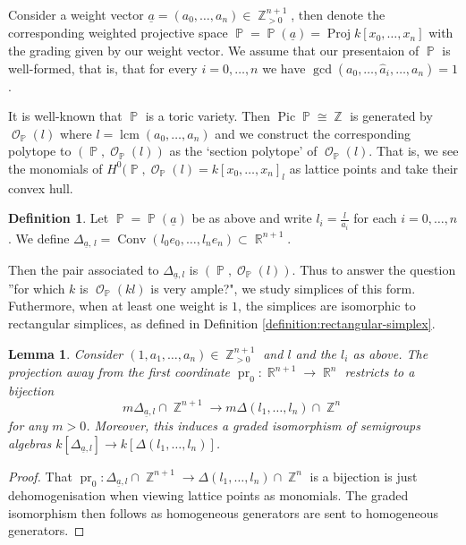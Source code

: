 \documentclass[a4paper,11pt]{amsart}
\theoremstyle{plain}
\newtheorem{lemma}[theorem]{Lemma}
\theoremstyle{definition}
\newtheorem{definition}[theorem]{Definition}
\theoremstyle{remark}
\DeclareMathOperator{\ZZ}{\mathbb{Z}}
\DeclareMathOperator{\RR}{\mathbb{R}}
\DeclareMathOperator{\PP}{\mathbb{P}}
\DeclareMathOperator{\cO}{\mathcal{O}}
\DeclareMathOperator{\Pic}{Pic}
\DeclareMathOperator{\Conv}{Conv}
\DeclareMathOperator{\lcm}{lcm}
\DeclareMathOperator{\pr}{pr}
\DeclareMathOperator{\Proj}{Proj}
\begin{document}
Consider a weight vector $\underline{a} = (a_0, \dots , a_n) \in \ZZ_{>0}^{n+1}$, then denote the corresponding weighted projective space $\PP = \PP(\underline{a}) = \Proj k[x_0, \dots , x_n]$ with the grading given by our weight vector.
We assume that our presentaion of $\PP$ is well-formed, that is, that for every $i = 0 ,\dots , n$ we have $\gcd(a_0, \dots, \hat{a}_i, \dots , a_n) = 1$.

It is well-known that $\PP$ is a toric variety.
Then $\Pic \PP \cong \ZZ$ is generated by $\cO_{\PP}(l)$ where $l = \lcm (a_0, \dots , a_n)$ and we construct the corresponding polytope to $(\PP, \cO_{\PP}(l))$ as the `section polytope' of $\cO_{\PP}(l)$.
That is, we see the monomials of $H^0(\PP,\cO_{\PP}(l) = k[x_0, \dots , x_n]_l$ as lattice points and take their convex hull.

\begin{definition}\label{definition:weighted-simplex}
    Let $\PP = \PP(\underline{a})$ be as above and write $l_i = \frac{l}{a_i}$ for each $i = 0, \dots , n$.
    We define $\Delta_{\underline{a},\,l} = \Conv(l_0e_0 , \dots , l_ne_n) \subset \RR^{n+1}$.
\end{definition}

Then the pair associated to $\Delta_{\underline{a},l}$ is $(\PP, \cO_{\PP}(l))$.
Thus to answer the question ''for which $k$ is $\cO_{\PP}(kl)$ is very ample?", we study simplices of this form.
Futhermore, when at least one weight is $1$, the simplices are isomorphic to rectangular simplices, as defined in Definition \ref{definition:rectangular-simplex}.

\begin{lemma}\label{lemma:projection-to-rec-simplices}
    Consider $(1,a_1, \dots , a_n) \in \ZZ^{n+1}_{>0}$ and $l$ and the $l_i$ as above.
    The projection away from the first coordinate $\pr_0 : \RR^{n+1} \rightarrow \RR^n$ restricts to a bijection
    \[m\Delta_{\underline{a},l} \cap \ZZ^{n+1}\rightarrow m\Delta(l_1 , \dots , l_n) \cap \ZZ^n\]
    for any $m>0$.
    Moreover, this induces a graded isomorphism of semigroups algebras $k[\Delta_{\underline{a},l}] \xrightarrow[]{} k[\Delta(l_1 , \dots , l_n)]$.
\end{lemma}

\begin{proof}
    That $\pr_0 : {\Delta_{\underline{a},l}} \cap \ZZ^{n+1} \rightarrow \Delta(l_1, \dots , l_n) \cap \ZZ^n$ is a bijection is just dehomogenisation when viewing lattice points as monomials.
    The graded isomorphism then follows as homogeneous generators are sent to homogeneous generators.
\end{proof}
\end{document}
